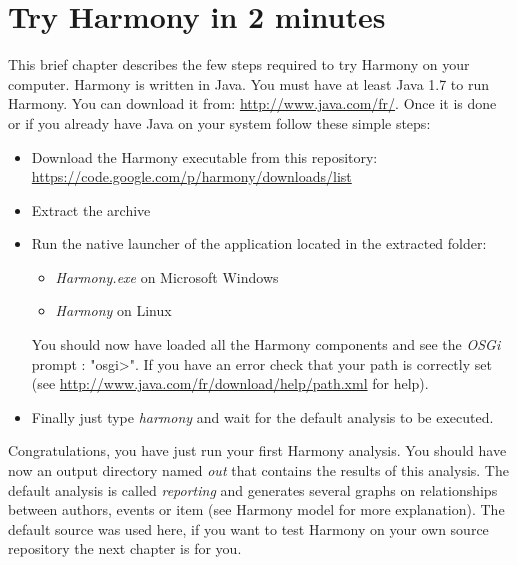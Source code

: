 \chapter{Try Harmony in 2 minutes}

This brief chapter describes the few steps required to try Harmony on your computer. Harmony is written in Java. You must have at least Java 1.7 to run Harmony. You can download it from: \url{http://www.java.com/fr/}. Once it is done or if you already have Java on your system follow these simple steps:
\begin{itemize}
	\item Download the Harmony executable from this repository: \\\url{https://code.google.com/p/harmony/downloads/list}
	\item Extract the archive
	\item Run the native launcher of the application located in the extracted folder:
		\begin{itemize}
			\item \emph{Harmony.exe} on Microsoft Windows
			\item \emph{Harmony} on Linux
		\end{itemize}
	You should now have loaded all the Harmony components and see the \emph{OSGi} prompt : "osgi>". If you have an error check that your path is correctly set (see \url{http://www.java.com/fr/download/help/path.xml} for help).	
	\item Finally just type \emph{harmony} and wait for the default analysis to be executed.
\end{itemize}

Congratulations, you have just run your first Harmony analysis. You should have now an output directory named \emph{out} that contains the results of this analysis. The default analysis is called \emph{reporting} and generates several graphs on relationships between authors, events or item (see Harmony model for more explanation). The default source was used here, if you want to test Harmony on your own source repository the next chapter is for you.
	



